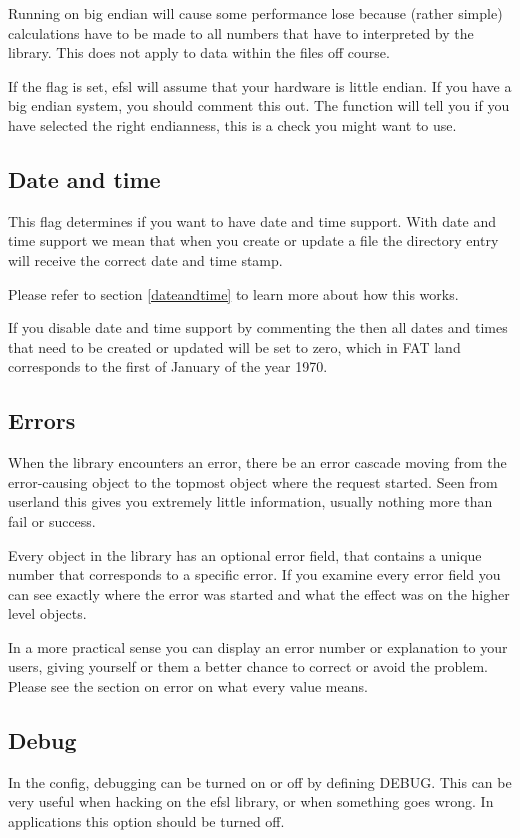 Running on big endian will cause some performance lose because (rather simple) calculations have
to be made to all numbers that have to interpreted by the library. This does not apply to
data within the files off course.

If the flag  is set, efsl will assume that your hardware is little endian.
If you have a big endian system, you should comment this out. The function 
will tell you if you have selected the right endianness, this is a check you might want to use.

\subsection{Date and time}
This flag determines if you want to have date and time support. With date and time support we
mean that when you create or update a file the directory entry will receive the correct date and
time stamp.

Please refer to section \ref{dateandtime} to learn more about how this works.

If you disable date and time support by commenting the  then
all dates and times that need to be created or updated will be set to zero, which in FAT land corresponds to the first of January of the year 1970.

\subsection{Errors}
When the library encounters an error, there be an error cascade moving from the error-causing object
to the topmost object where the request started. Seen from userland this gives you extremely little
information, usually nothing more than fail or success.

Every object in the library has an optional error field, that contains a unique number that
corresponds to a specific error. If you examine every error field you can see exactly where the
error was started and what the effect was on the higher level objects.

In a more practical sense you can display an error number or explanation to your users, giving
yourself or them a better chance to correct or avoid the problem.
Please see the section on error on what every value means.

\subsection{Debug}
In the config, debugging can be turned on or off by defining DEBUG. This can be 
very useful when hacking on the efsl library, or when something goes wrong. 
In applications this option should be turned off.

